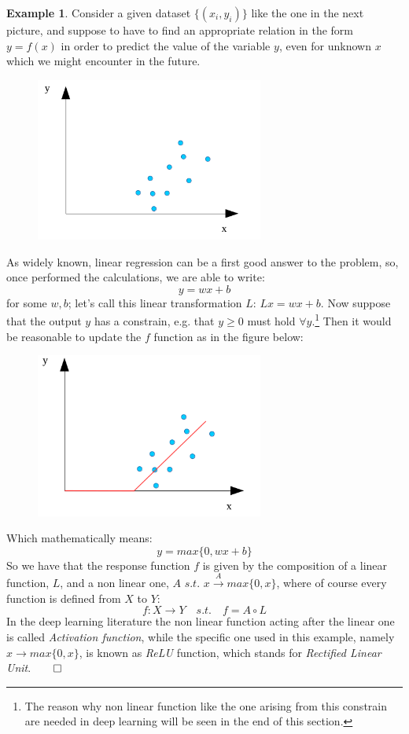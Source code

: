 \documentclass[12pt, a4paper]{report}
\theoremstyle{definition}
\newtheorem{Example}{Example}
\begin{document}
\begin{Example}\label{example1}
Consider a given dataset $\{(x_i,y_i)\}$ like the one in the next picture, and suppose to have to find an appropriate relation in the form $y=f(x)$ in order to predict the value of the variable $y$, even for unknown $x$ which we might encounter in the future.
\begin{figure}[H]
	\centering
	\includegraphics[width=7.5cm]{img/regression1}
	\caption{}
\end{figure}
\noindent As widely known, linear regression can be a first good answer to the problem, so, once performed the calculations, we are able to write:
\[
y=wx + b
\]
for some $w,b$; let's call this linear transformation $L\!: \, Lx=wx+b$. Now suppose that the output $y$ has a constrain, e.g. that $y\ge0$ must hold $ \forall y $.\footnote{The reason why non linear function like the one arising from this constrain are needed in deep learning will be seen in the end of this section.} Then it would be reasonable to update the $f$ function as in the figure below:
\begin{figure}[H]
	\centering
	\includegraphics[width=7.5cm]{img/regression2} 
	\caption{}
\end{figure}
\noindent Which mathematically means:
\[
y=max\{0,wx+b\}
\]
So we have that the response function $f$ is given by the composition of a linear function, $L$, and a non linear one, $A\,\,s.t.\,\, x\overset{A}{\longrightarrow}max\{0,x\}$, where of course every function is defined from $X$ to $Y$:
\[
f:X\rightarrow Y\quad s.t.\quad f=A\circ L
\]
In the deep learning literature the non linear function acting after the linear one is called \textit{Activation function}, while the specific one used in this example, namely $x\rightarrow max\{0,x\}$, is known as \textit{ReLU} function, which stands for \textit{Rectified Linear Unit}.$\qed$
\end{Example}
\end{document}
